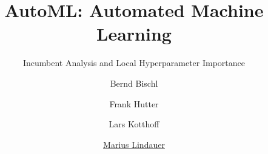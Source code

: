 




\title[AutoML: Overview]{AutoML: Automated Machine Learning}
\subtitle{Incumbent Analysis and Local Hyperparameter Importance}
\author[Marius Lindauer]{Bernd Bischl \and Frank Hutter \and Lars Kotthoff \and \underline{Marius Lindauer}}
\institute{}
\date{}





	
	\maketitle
	

